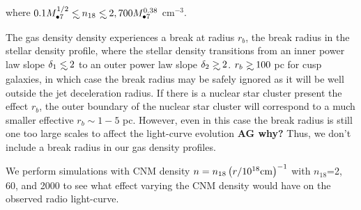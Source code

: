 \documentclass[usenatbib,fleqn]{mnras}
\newcommand\lsim{\mathrel{\rlap{\lower4pt\hbox{\hskip1pt$\sim$}}
    \raise1pt\hbox{$<$}}}
\newcommand\gsim{\mathrel{\rlap{\lower4pt\hbox{\hskip1pt$\sim$}}
    \raise1pt\hbox{$>$}}}
\newcommand{\Mbh}[1][]{M_{\bullet#1}}
\begin{document}
where $0.1 \Mbh[7]^{1/2} \lsim n_{\rm 18}\lsim 2,700
\Mbh[7]^{0.38} $ cm$^{-3}$.  

The gas density density experiences a break at radius $r_b$, the break
radius in the stellar density profile, where the stellar density
transitions from an inner power law slope $\delta_1\lsim 2$ to an outer
power law slope $\delta_2\gsim 2$. $r_b\gsim 100$ pc for cusp galaxies,
in which case the break radius may be safely ignored as it will be
well outside the jet deceleration radius. If there is a nuclear
star cluster present the effect $r_b$, the outer boundary of the
nuclear star cluster will correspond to a much smaller effective
$r_b\sim 1-5$ pc. However, even in this case the break radius is still
one too large scales to affect the light-curve evolution {\bf AG why?}
Thus, we don't include a break radius in our gas density profiles.

We perform simulations with CNM density $n=n_{18} \left(r/10^{18} {\rm
  cm}\right)^{-1}$ with $n_{18}$=2, 60, and 2000 to see what effect
varying the CNM density would have on the observed radio light-curve.




\end{document}
